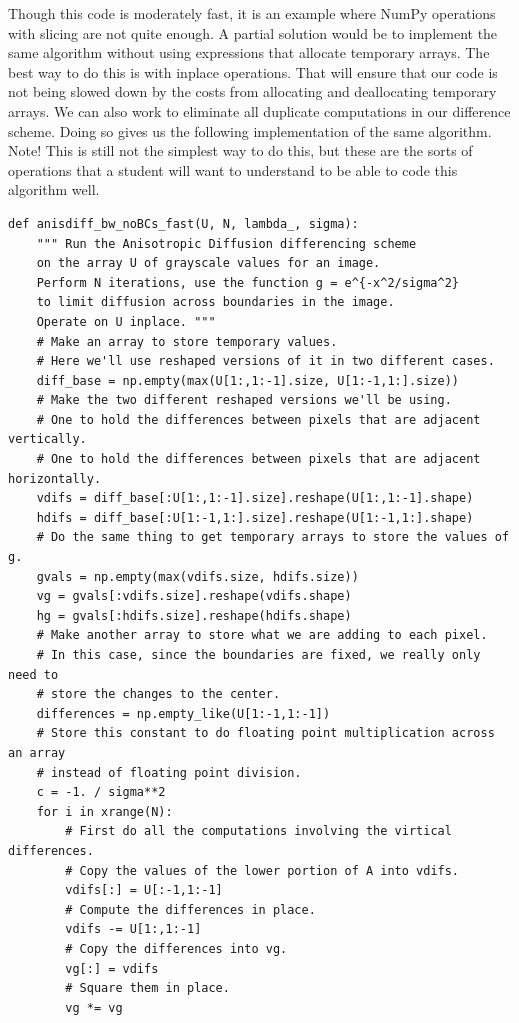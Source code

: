 Though this code is moderately fast, it is an example where NumPy operations with slicing are not quite enough.
A partial solution would be to implement the same algorithm without using expressions that allocate temporary arrays.
The best way to do this is with inplace operations.
That will ensure that our code is not being slowed down by the costs from allocating and deallocating temporary arrays.
We can also work to eliminate all duplicate computations in our difference scheme.
Doing so gives us the following implementation of the same algorithm.
Note! This is still not the simplest way to do this, but these are the sorts of operations that a student will want to understand to be able to code this algorithm well.
\begin{lstlisting}
def anisdiff_bw_noBCs_fast(U, N, lambda_, sigma):
    """ Run the Anisotropic Diffusion differencing scheme
    on the array U of grayscale values for an image.
    Perform N iterations, use the function g = e^{-x^2/sigma^2}
    to limit diffusion across boundaries in the image.
    Operate on U inplace. """
    # Make an array to store temporary values.
    # Here we'll use reshaped versions of it in two different cases.
    diff_base = np.empty(max(U[1:,1:-1].size, U[1:-1,1:].size))
    # Make the two different reshaped versions we'll be using.
    # One to hold the differences between pixels that are adjacent vertically.
    # One to hold the differences between pixels that are adjacent horizontally.
    vdifs = diff_base[:U[1:,1:-1].size].reshape(U[1:,1:-1].shape)
    hdifs = diff_base[:U[1:-1,1:].size].reshape(U[1:-1,1:].shape)
    # Do the same thing to get temporary arrays to store the values of g.
    gvals = np.empty(max(vdifs.size, hdifs.size))
    vg = gvals[:vdifs.size].reshape(vdifs.shape)
    hg = gvals[:hdifs.size].reshape(hdifs.shape)
    # Make another array to store what we are adding to each pixel.
    # In this case, since the boundaries are fixed, we really only need to
    # store the changes to the center.
    differences = np.empty_like(U[1:-1,1:-1])
    # Store this constant to do floating point multiplication across an array
    # instead of floating point division.
    c = -1. / sigma**2
    for i in xrange(N):
        # First do all the computations involving the virtical differences.
        # Copy the values of the lower portion of A into vdifs.
        vdifs[:] = U[:-1,1:-1]
        # Compute the differences in place.
        vdifs -= U[1:,1:-1]
        # Copy the differences into vg.
        vg[:] = vdifs
        # Square them in place.
        vg *= vg

\end{lstlisting}
